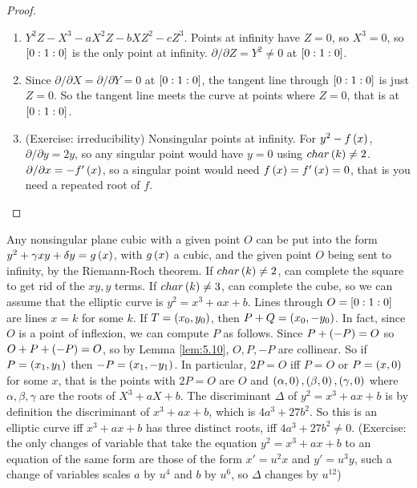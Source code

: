 \begin{proof}
\hfill
\begin{enumerate}
\item $ Y^2Z - X^3 - aX^2Z - bXZ^2 - cZ^3 $. Points at infinity have $ Z = 0 $, so $ X^3 = 0 $, so $ \sb{0 : 1 : 0} $ is the only point at infinity. $ \partial / \partial Z = Y^2 \ne 0 $ at $ \sb{0 : 1 : 0} $.
\item Since $ \partial / \partial X = \partial / \partial Y = 0 $ at $ \sb{0 : 1 : 0} $, the tangent line through $ \sb{0 : 1 : 0} $ is just $ Z = 0 $. So the tangent line meets the curve at points where $ Z = 0 $, that is at $ \sb{0 : 1 : 0} $.
\item (Exercise: irreducibility) Nonsingular points at infinity. For $ y^2 - f\rb{x} $, $ \partial / \partial y = 2y $, so any singular point would have $ y = 0 $ using $ char\rb{k} \ne 2 $. $ \partial / \partial x = -f'\rb{x} $, so a singular point would need $ f\rb{x} = f'\rb{x} = 0 $, that is you need a repeated root of $ f $.
\end{enumerate}
\end{proof}

\begin{fact*}
Any nonsingular plane cubic with a given point $ O $ can be put into the form $ y^2 + \gamma xy + \delta y = g\rb{x} $, with $ g\rb{x} $ a cubic, and the given point $ O $ being sent to infinity, by the Riemann-Roch theorem. If $ char\rb{k} \ne 2 $, can complete the square to get rid of the $ xy, y $ terms. If $ char\rb{k} \ne 3 $, can complete the cube, so we can assume that the elliptic curve is $ y^2 = x^3 + ax + b $. Lines through $ O = \sb{0 : 1 : 0} $ are lines $ x = k $ for some $ k $. If $ T = \rb{x_0, y_0} $, then $ P + Q = \rb{x_0, -y_0} $. In fact, since $ O $ is a point of inflexion, we can compute $ P $ as follows. Since $ P + \rb{-P} = O $ so $ O + P + \rb{-P} = O $, so by Lemma \ref{lem:5.10}, $ O, P, -P $ are collinear. So if $ P = \rb{x_1, y_1} $ then $ -P = \rb{x_1, -y_1} $. In particular, $ 2P = O $ iff $ P = O $ or $ P = \rb{x, 0} $ for some $ x $, that is the points with $ 2P = O $ are $ O $ and $ \rb{\alpha, 0}, \rb{\beta, 0}, \rb{\gamma, 0} $ where $ \alpha, \beta, \gamma $ are the roots of $ X^3 + aX + b $. The discriminant $ \Delta $ of $ y^2 = x^3 + ax + b $ is by definition the discriminant of $ x^3 + ax + b $, which is $ 4a^3 + 27b^2 $. So this is an elliptic curve iff $ x^3 + ax + b $ has three distinct roots, iff $ 4a^3 + 27b^2 \ne 0 $. (Exercise: the only changes of variable that take the equation $ y^2 = x^3 + ax + b $ to an equation of the same form are those of the form $ x' = u^2x $ and $ y' = u^3y $, such a change of variables scales $ a $ by $ u^4 $ and $ b $ by $ u^6 $, so $ \Delta $ changes by $ u^{12} $)
\end{fact*}

